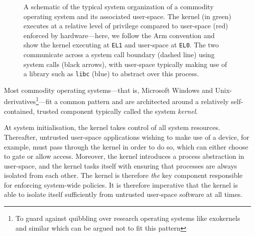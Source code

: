\documentclass[a4paper, UKenglish, cleveref, autoref, thm-restate]{lipics-v2021}
\begin{document}
\begin{figure}
\caption{A schematic of the typical system organization of a commodity operating system and its associated user-space.
The kernel (in green) executes at a relative level of privilege compared to user-space (red) enforced by hardware---here, we follow the Arm convention and show the kernel executing at \texttt{EL1} and user-space at \texttt{EL0}.
The two communicate across a system call boundary (dashed line) using system calls (black arrows), with user-space typically making use of a library such as \texttt{libc} (blue) to abstract over this process.}
\label{fig.operating-system.schematic}
\end{figure}

Most commodity operating systems---that is, Microsoft Windows and Unix-derivatives\footnote{To guard against quibbling over research operating systems like exokernels and similar which can be argued not to fit this pattern}---fit a common pattern and are architected around a relatively self-contained, trusted component typically called the system \emph{kernel}.

At system initialisation, the kernel takes control of all system resources.
Thereafter, untrusted user-space applications wishing to make use of a device, for example, must pass through the kernel in order to do so, which can either choose to gate or allow access.
Moreover, the kernel introduces a process abstraction in user-space, and the kernel tasks itself with ensuring that processes are always isolated from each other.
The kernel is therefore \emph{the} key component responsible for enforcing system-wide policies.
It is therefore imperative that the kernel is able to isolate itself sufficiently from untrusted user-space software at all times.
\end{document}
